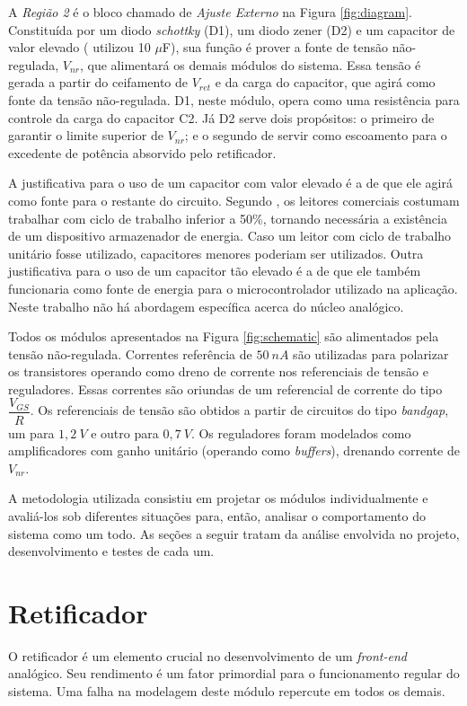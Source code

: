 A \emph{Região 2} é o bloco chamado de \emph{Ajuste Externo} na Figura \ref{fig:diagram}. Constituída por um diodo \textit{schottky} ({D1}), um diodo zener ({D2}) e um capacitor de valor elevado ( utilizou 10 $\mu$F), sua função é prover a fonte de tensão não-regulada, $V_{nr}$, que alimentará os demais módulos do sistema. Essa tensão é gerada a partir do ceifamento de $V_{ret}$ e da carga do capacitor, que agirá como fonte da tensão não-regulada. {D1}, neste módulo, opera como uma resistência para controle da carga do capacitor {C2}. Já {D2} serve dois propósitos: o primeiro de garantir o limite superior de $V_{nr}$; e o segundo de servir como escoamento para o excedente de potência absorvido pelo retificador.

A justificativa para o uso de um capacitor com valor elevado é a de que ele agirá como fonte para o restante do circuito. Segundo , os leitores comerciais costumam trabalhar com ciclo de trabalho inferior a 50\%, tornando necessária a existência de um dispositivo armazenador de energia. Caso um leitor com ciclo de trabalho unitário fosse utilizado, capacitores menores poderiam ser utilizados. Outra justificativa para o uso de um capacitor tão elevado é a de que ele também funcionaria como fonte de energia para o microcontrolador utilizado na aplicação. Neste trabalho não há abordagem específica acerca do núcleo analógico.

Todos os módulos apresentados na Figura \ref{fig:schematic} são alimentados pela tensão não-regulada. Correntes referência de $50~nA$ são utilizadas para polarizar os transistores operando como dreno de corrente nos referenciais de tensão e reguladores. Essas correntes são oriundas de um referencial de corrente do tipo $\dfrac{V_{GS}}{R}$. Os referenciais de tensão são obtidos a partir de circuitos do tipo \textit{bandgap}, um para $1,2~V$ e outro para $0,7~V$. Os reguladores foram modelados como amplificadores com ganho unitário (operando como \textit{buffers}), drenando corrente de $V_{nr}$.

A metodologia utilizada consistiu em projetar os módulos individualmente e avaliá-los sob diferentes situações para, então, analisar o comportamento do sistema como um todo. As seções a seguir tratam da análise envolvida no projeto, desenvolvimento e testes de cada um.


\section{Retificador}
O retificador é um elemento crucial no desenvolvimento de um \textit{front-end} analógico. Seu rendimento é um fator primordial para o funcionamento regular do sistema. Uma falha na modelagem deste módulo repercute em todos os demais.

